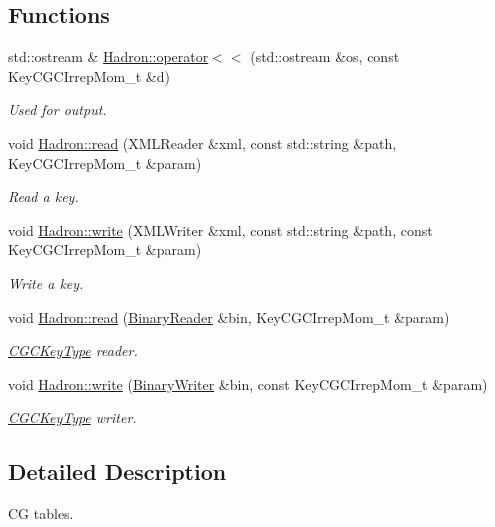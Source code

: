 \subsection*{Functions}
\begin{DoxyCompactItemize}
\item 
std\+::ostream \& \mbox{\hyperlink{namespaceHadron_aa163d93f390345d74a2db05417fba452}{Hadron\+::operator$<$$<$}} (std\+::ostream \&os, const Key\+C\+G\+C\+Irrep\+Mom\+\_\+t \&d)
\begin{DoxyCompactList}\small\item\em Used for output. \end{DoxyCompactList}\item 
void \mbox{\hyperlink{namespaceHadron_ab8d127a4d4a1ca38aae1b0d45226789e}{Hadron\+::read}} (X\+M\+L\+Reader \&xml, const std\+::string \&path, Key\+C\+G\+C\+Irrep\+Mom\+\_\+t \&param)
\begin{DoxyCompactList}\small\item\em Read a key. \end{DoxyCompactList}\item 
void \mbox{\hyperlink{namespaceHadron_a2454ead756c8c4f2b1f75bbf8d3c1070}{Hadron\+::write}} (X\+M\+L\+Writer \&xml, const std\+::string \&path, const Key\+C\+G\+C\+Irrep\+Mom\+\_\+t \&param)
\begin{DoxyCompactList}\small\item\em Write a key. \end{DoxyCompactList}\item 
void \mbox{\hyperlink{namespaceHadron_a0fa916d0de711ad2cf389173ad463f51}{Hadron\+::read}} (\mbox{\hyperlink{classADATIO_1_1BinaryReader}{Binary\+Reader}} \&bin, Key\+C\+G\+C\+Irrep\+Mom\+\_\+t \&param)
\begin{DoxyCompactList}\small\item\em \mbox{\hyperlink{structHadron_1_1CGCKeyType}{C\+G\+C\+Key\+Type}} reader. \end{DoxyCompactList}\item 
void \mbox{\hyperlink{namespaceHadron_ae48dac33aabaaf829859c63a77a06b8b}{Hadron\+::write}} (\mbox{\hyperlink{classADATIO_1_1BinaryWriter}{Binary\+Writer}} \&bin, const Key\+C\+G\+C\+Irrep\+Mom\+\_\+t \&param)
\begin{DoxyCompactList}\small\item\em \mbox{\hyperlink{structHadron_1_1CGCKeyType}{C\+G\+C\+Key\+Type}} writer. \end{DoxyCompactList}\end{DoxyCompactItemize}


\subsection{Detailed Description}
CG tables. 


